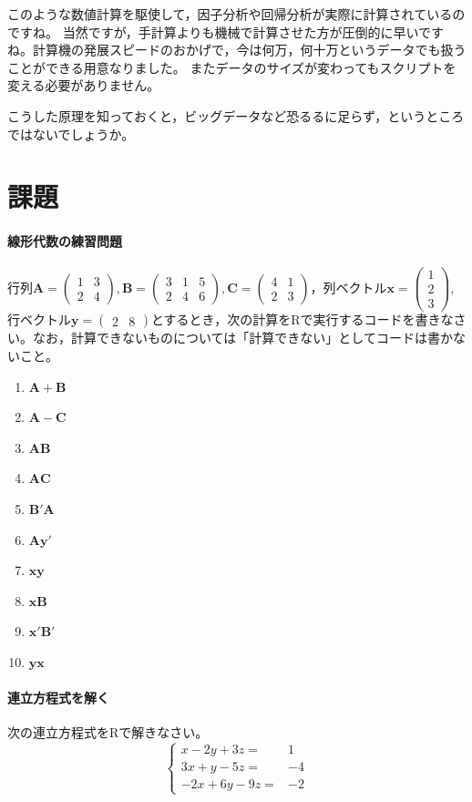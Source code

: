 \documentclass{ltjsbook}
\begin{document}
このような数値計算を駆使して，因子分析や回帰分析が実際に計算されているのですね。
当然ですが，手計算よりも機械で計算させた方が圧倒的に早いですね。計算機の発展スピードのおかげで，今は何万，何十万というデータでも扱うことができる用意なりました。
またデータのサイズが変わってもスクリプトを変える必要がありません。

こうした原理を知っておくと，ビッグデータなど恐るるに足らず，というところではないでしょうか。

\section{課題}
\paragraph{線形代数の練習問題}行列$\bm{A}=\begin{pmatrix}1 & 3 \\2 & 4\end{pmatrix},\bm{B}=\begin{pmatrix}3&1&5\\2&4&6\end{pmatrix},\bm{C}=\begin{pmatrix}4&1\\2&3\end{pmatrix}$，列ベクトル$\bm{x}=\begin{pmatrix}1\\2\\3\end{pmatrix}$,行ベクトル$\bm{y}=\begin{pmatrix}2&8\end{pmatrix}$とするとき，次の計算をRで実行するコードを書きなさい。なお，計算できないものについては「計算できない」としてコードは書かないこと。
\begin{enumerate}
	\item $\bm{A}+\bm{B}$
	\item $\bm{A}-\bm{C}$
	\item $\bm{AB}$
	\item $\bm{AC}$
	\item $\bm{B}'\bm{A}$
	\item $\bm{A}\bm{y}'$
	\item $\bm{xy}$
	\item $\bm{xB}$
	\item $\bm{x}'\bm{B}'$
	\item $\bm{yx}$
\end{enumerate}

\paragraph{連立方程式を解く}次の連立方程式をRで解きなさい。
\[
	\left\{\begin{array}{rr}x-2 y+3 z= & 1 \\ 3 x+y-5 z= & -4 \\ -2 x+6 y-9 z= & -2\end{array}\right.
\]
\end{document}
